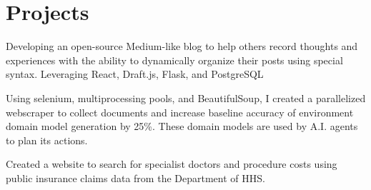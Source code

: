 \documentclass[]{deedy-resume-openfont}
\begin{document}
\begin{minipage}[t]{0.66\textwidth}
\section{Projects}

\begin{tightemize}
\item Developing an open-source Medium-like blog to help others record thoughts and experiences with the ability to dynamically organize their posts using special syntax. Leveraging React, Draft.js, Flask, and PostgreSQL
\end{tightemize}
\sectionsep

\begin{tightemize}
\item Using selenium, multiprocessing pools, and BeautifulSoup, I created a parallelized webscraper to collect documents and increase baseline accuracy of environment domain model generation by 25\%. These domain models are used by A.I. agents to plan its actions.
\end{tightemize}
\sectionsep

\begin{tightemize}
\item Created a website to search for specialist doctors and procedure costs using public insurance claims data from the Department of HHS.
\end{tightemize}




\end{minipage}
\end{document}
